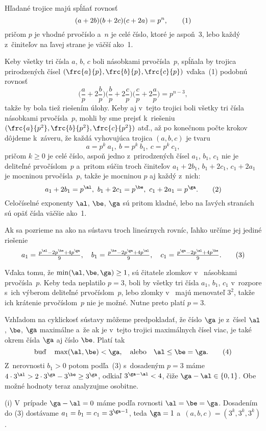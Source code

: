 {%
Hľadané trojice majú spĺňať rovnosť
$$
(a+2b)(b+2c)(c+2a)=p^n, \tag1
$$
pričom $p$ je vhodné prvočíslo a~$n$ je celé číslo, ktoré je
aspoň~3, lebo každý z~činiteľov na ľavej strane  je väčší
ako~1.

Keby všetky tri čísla $a$, $b$, $c$ boli násobkami prvočísla~$p$,
spĺňala by trojica prirodzených čísel
$(\frc{a}{p},\frc{b}{p},\frc{c}{p})$
vďaka~(1) podobnú rovnosť
$$
\Big(\frac{a}{p}+2\frac{b}{p}\Big)
\Big(\frac{b}{p}+2\frac{c}{p}\Big)
\Big(\frac{c}{p}+2\frac{a}{p}\Big)=p^{n-3},
$$
takže by bola tiež riešením úlohy. Keby aj v~tejto trojici boli
všetky tri čísla násobkami prvočísla~$p$, mohli by sme prejsť
k~riešeniu $(\frc{a}{p^2},\frc{b}{p^2},\frc{c}{p^2})$ atď., až po
konečnom počte krokov dôjdeme k~záveru, že každá
vyhovujúca trojica $(a,b,c)$ je tvaru
$$
a=p^k~a_1,\
b=p^k~b_1,\
c=p^k~c_1,
$$
pričom $k\ge0$ je celé číslo, aspoň jedno z~prirodzených čísel
$a_1$, $b_1$, $c_1$ nie je deliteľné prvočíslom~$p$ a~pritom súčin
troch činiteľov $a_1+2b_1$, $b_1+2c_1$, $c_1+2a_1$ je mocninou
prvočísla~$p$, takže je mocninou $p$ aj každý z~nich:
$$
a_1+2b_1=p^{\al},\ b_1+2c_1=p^{\be},\ c_1+2a_1=p^{\ga}. \tag2
$$
Celočíselné exponenty $\al$, $\be$, $\ga$ sú pritom kladné, lebo na
ľavých stranách  sú opäť čísla väčšie ako~1.

Ak sa pozrieme na \thetag{2} ako na sústavu troch lineárnych rovníc,
ľahko určíme jej jediné riešenie
$$
a_1=\frac{p^{\al}-2p^{\be}+4p^{\ga}}{9},\quad
b_1=\frac{p^{\be}-2p^{\ga}+4p^{\al}}{9},\quad
c_1=\frac{p^{\ga}-2p^{\al}+4p^{\be}}{9}. \tag3
$$

Vďaka tomu, že $\min(\al,\be,\ga)\ge1$, sú čitatele zlomkov
v~ násobkami prvočísla~$p$. Keby teda neplatilo $p=3$, boli
by
všetky tri čísla $a_1$, $b_1$, $c_1$ v~rozpore s~ich výberom
deliteľné prvočíslom~$p$, lebo zlomky v~ majú menovateľ
$3^2$, takže ich krátenie prvočíslom~$p$ nie je možné. Nutne
preto platí $p=3$.

Vzhľadom na cyklickosť sústavy  môžeme predpokladať, že
číslo $\ga$ je z~čísel $\al$, $\be$, $\ga$ maximálne a~že ak
je v~tejto trojici maximálnych čísel viac, je také okrem
čísla $\ga$ aj číslo $\be$. Platí tak
$$
\text{buď}\quad\max(\al,\be)<\ga,\quad\text{alebo}\quad \al\le\be=\ga. \tag4
$$
Z~nerovnosti $b_1>0$ potom podľa~(3) s~dosadeným $p=3$ máme
$4\cdot3^{\al}>2\cdot3^{\ga}-3^{\be}\ge3^{\ga}$, odkiaľ
$3^{\ga-\al}<4$, čiže $\ga-\al\in\{0, 1\}$. Obe možné hodnoty
teraz analyzujme osobitne.

(i) V~prípade $\ga-\al=0$ máme podľa  rovnosti $\al=\be=\ga$.
Dosadením do (3) dostávame $a_1=b_1=c_1=3^{\ga-1}$, teda $\ga=1$
a~$(a,b,c)=(3^k, 3^k, 3^k)$.

}
